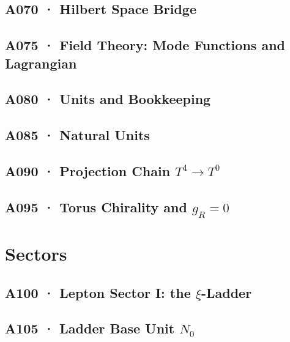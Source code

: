 \documentclass[11pt,twoside,openright]{book}
\begin{document}
\chapter[A070 · Hilbert Space Bridge]{A070 · Hilbert Space Bridge}


\chapter[A075 · Field Theory]{A075 · Field Theory: Mode Functions and Lagrangian}


\chapter[A080 · Units and Bookkeeping]{A080 · Units and Bookkeeping}


\chapter[A085 · Natural Units]{A085 · Natural Units}


\chapter[A090 · Projection Chain $T^4\to T^0$]{A090 · Projection Chain $T^4\to T^0$}


\chapter[A095 · Torus Chirality]{A095 · Torus Chirality and $g_R=0$}


\part{Sectors}

\chapter[A100 · Lepton Sector]{A100 · Lepton Sector I: the $\xi$-Ladder}


\chapter[A105 · Ladder Base Unit $N_0$]{A105 · Ladder Base Unit $N_0$}

\end{document}
